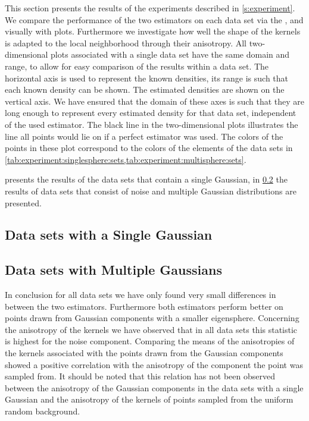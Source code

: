 
This section presents the results of the experiments described in \cref{s:experiment}. 
We compare the performance of the two estimators on each data set via the \mse,  and visually with plots. Furthermore we investigate how well the shape of the kernels is adapted to the local neighborhood through their anisotropy.
	All two-dimensional plots associated with a single data set have the same domain and range, to allow for easy comparison of the results within a data set. The horizontal axis is used to represent the known densities, its range is such that each known density can be shown. The estimated densities are shown on the vertical axis. We have ensured that the domain of these axes is such that they are long enough to represent every estimated density for that data set, independent of the used estimator. 
	The black line in the two-dimensional plots illustrates the line all points would lie on if a perfect estimator was used.
	The colors of the points in these plot correspond to the colors of the elements of the data sets in \cref{tab:experiment:singlesphere:sets,tab:experiment:multisphere:sets}.

	 presents the results of the data sets that contain a single Gaussian, in \cref{s:results:multipleGaussian} the results of data sets that consist of noise and multiple Gaussian distributions are presented. 

\subsection{Data sets with a Single Gaussian}
\label{s:results:singleGaussian}


\subsection{Data sets with Multiple Gaussians}
\label{s:results:multipleGaussian}


	In conclusion for all data sets we have only found very small differences in \mse between the two estimators. 
	Furthermore both estimators perform better on points drawn from Gaussian components with a smaller eigensphere. 
	Concerning the anisotropy of the kernels we have observed that in all data sets this statistic is highest for the noise component. 
	Comparing the means of the anisotropies of the kernels associated with the points drawn from the Gaussian components showed a positive correlation with the anisotropy of the component the point was sampled from. It should be noted that this relation has not been observed between the anisotropy of the Gaussian components in the data sets with a single Gaussian and the anisotropy of the kernels of points sampled from the uniform random background.